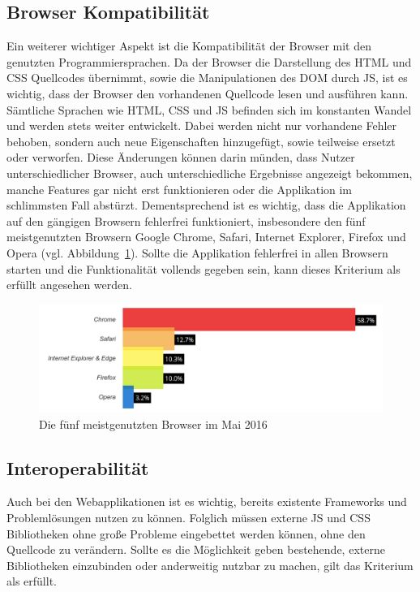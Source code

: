 \subsection{Browser Kompatibilität}
\label{sec:Browser Kompatibilität}
Ein weiterer wichtiger Aspekt ist die Kompatibilität der Browser mit den genutzten Programmiersprachen. Da der Browser die Darstellung des \ac{HTML} und \ac{CSS} Quellcodes übernimmt, sowie die Manipulationen des DOM durch \ac{JS}, ist es wichtig, dass der Browser den vorhandenen Quellcode lesen und ausführen kann. Sämtliche Sprachen wie \ac{HTML}, \ac{CSS} und \ac{JS} befinden sich im konstanten Wandel und werden stets weiter entwickelt.
Dabei werden nicht nur vorhandene Fehler behoben, sondern auch neue Eigenschaften hinzugefügt, sowie teilweise ersetzt oder verworfen. Diese Änderungen können darin münden, dass Nutzer unterschiedlicher Browser, auch unterschiedliche Ergebnisse angezeigt bekommen, manche Features gar nicht erst funktionieren oder die Applikation im schlimmsten Fall abstürzt. Dementsprechend ist es wichtig, dass die Applikation auf den gängigen Browsern fehlerfrei funktioniert, insbesondere den fünf meistgenutzten Browsern Google Chrome, Safari, Internet Explorer, Firefox und Opera (vgl. Abbildung~\ref{fig:browser-may-2016}). Sollte die Applikation fehlerfrei in allen Browsern starten und die Funktionalität vollends gegeben sein, kann dieses Kriterium als erfüllt angesehen werden.

\begin{figure}[hb]
  \centering  
  \includegraphics[scale=0.3]{img/browser_2016.png}
  \caption{Die fünf meistgenutzten Browser im Mai 2016 \cite{top-five-browser-statistics}}\label{fig:browser-may-2016}
\end{figure}

\subsection{Interoperabilität}
\label{sec:Interoperabilität_Analyse}
Auch bei den Webapplikationen ist es wichtig, bereits existente Frameworks und Problemlösungen nutzen zu können. Folglich müssen externe \ac{JS} und \ac{CSS} Bibliotheken ohne große Probleme eingebettet werden können, ohne den Quellcode zu verändern. Sollte es die Möglichkeit geben bestehende, externe Bibliotheken einzubinden oder anderweitig nutzbar zu machen, gilt das Kriterium als erfüllt.


